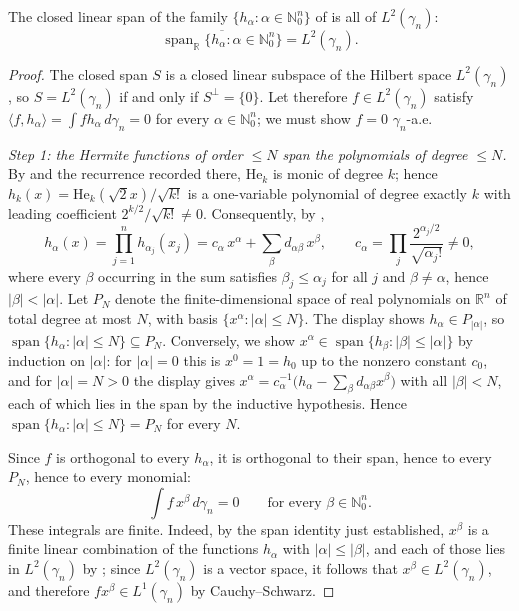 \begin{lemma}
The closed linear span of the family $\{h_\alpha : \alpha \in \mathbb{N}_0^n\}$ of
 is all of $L^2(\gamma_n)$:
\[
  \overline{\operatorname{span}_{\mathbb{R}}\{h_\alpha : \alpha \in \mathbb{N}_0^n\}}
    = L^2(\gamma_n).
\]
\end{lemma}
\begin{proof}
The closed span $S$ is a closed linear subspace of the Hilbert space
$L^2(\gamma_n)$, so $S = L^2(\gamma_n)$ if and only if $S^\perp = \{0\}$.  Let
therefore $f \in L^2(\gamma_n)$ satisfy
$\langle f, h_\alpha\rangle = \int f h_\alpha\, d\gamma_n = 0$ for every
$\alpha \in \mathbb{N}_0^n$; we must show $f = 0$ $\gamma_n$-a.e.

\emph{Step 1: the Hermite functions of order $\leq N$ span the polynomials of
degree $\leq N$.}
By  and the recurrence recorded there, $\mathrm{He}_k$ is monic of
degree $k$; hence $h_k(x) = \mathrm{He}_k(\sqrt2 x)/\sqrt{k!}$ is a one-variable
polynomial of degree exactly $k$ with leading coefficient
$2^{k/2}/\sqrt{k!} \neq 0$.  Consequently, by ,
\[
  h_\alpha(x) = \prod_{j=1}^n h_{\alpha_j}(x_j)
    = c_\alpha\, x^\alpha + \sum_{\beta} d_{\alpha\beta}\, x^\beta ,
    \qquad c_\alpha = \prod_j \frac{2^{\alpha_j/2}}{\sqrt{\alpha_j!}} \neq 0,
\]
where every $\beta$ occurring in the sum satisfies $\beta_j \leq \alpha_j$ for all
$j$ and $\beta \neq \alpha$, hence $|\beta| < |\alpha|$.  Let $P_N$ denote the
finite-dimensional space of real polynomials on $\mathbb{R}^n$ of total degree at
most $N$, with basis $\{x^\alpha : |\alpha| \leq N\}$.  The display shows
$h_\alpha \in P_{|\alpha|}$, so $\operatorname{span}\{h_\alpha : |\alpha|\leq N\}
\subseteq P_N$.  Conversely, we show $x^\alpha \in \operatorname{span}\{h_\beta :
|\beta| \leq |\alpha|\}$ by induction on $|\alpha|$: for $|\alpha| = 0$ this is
$x^0 = 1 = h_0$ up to the nonzero constant $c_0$, and for $|\alpha| = N > 0$ the
display gives
$x^\alpha = c_\alpha^{-1}\bigl(h_\alpha - \sum_\beta d_{\alpha\beta} x^\beta\bigr)$
with all $|\beta| < N$, each of which lies in the span by the inductive
hypothesis.  Hence
$\operatorname{span}\{h_\alpha : |\alpha| \leq N\} = P_N$ for every $N$.

Since $f$ is orthogonal to every $h_\alpha$, it is orthogonal to their span,
hence to every $P_N$, hence to every monomial:
\begin{equation*}
  \int f\, x^\beta \, d\gamma_n = 0 \qquad\text{for every }
  \beta \in \mathbb{N}_0^n. \tag{1}
\end{equation*}
These integrals are finite.  Indeed, by the span identity just established,
$x^\beta$ is a finite linear combination of the functions $h_\alpha$ with
$|\alpha| \leq |\beta|$, and each of those lies in $L^2(\gamma_n)$ by
; since $L^2(\gamma_n)$ is a vector space, it follows
that $x^\beta \in L^2(\gamma_n)$, and therefore $f x^\beta \in L^1(\gamma_n)$
by Cauchy--Schwarz.


\end{proof}
